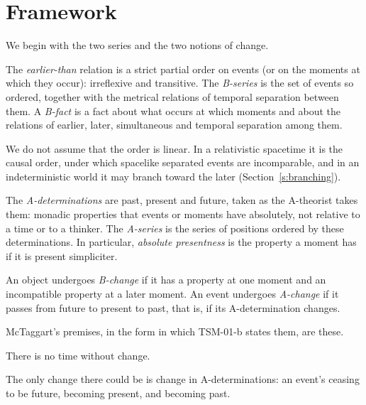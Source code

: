 \documentclass{situationist-preprint}
\begin{document}
\section{Framework}\label{s:framework}

We begin with the two series and the two notions of change.

\begin{definition}[B-series]\label{d:bseries}
The \emph{earlier-than} relation is a strict partial order on events (or on the moments at which they occur): irreflexive and transitive. The \emph{B-series} is the set of events so ordered, together with the metrical relations of temporal separation between them. A \emph{B-fact} is a fact about what occurs at which moments and about the relations of earlier, later, simultaneous and temporal separation among them.
\end{definition}

We do not assume that the order is linear. In a relativistic spacetime it is the causal order, under which spacelike separated events are incomparable, and in an indeterministic world it may branch toward the later (Section~\ref{s:branching}).

\begin{definition}[A-determinations]\label{d:adet}
The \emph{A-determinations} are past, present and future, taken as the A-theorist takes them: monadic properties that events or moments have absolutely, not relative to a time or to a thinker. The \emph{A-series} is the series of positions ordered by these determinations. In particular, \emph{absolute presentness} is the property a moment has if it is present simpliciter.
\end{definition}

\begin{definition}\label{d:change}
An object undergoes \emph{B-change} if it has a property at one moment and an incompatible property at a later moment. An event undergoes \emph{A-change} if it passes from future to present to past, that is, if its A-determination changes.
\end{definition}

McTaggart's premises, in the form in which TSM-01-b states them, are these.

\begin{assumption}\label{a:m1}
There is no time without change.
\end{assumption}

\begin{assumption}\label{a:m2}
The only change there could be is change in A-determinations: an event's ceasing to be future, becoming present, and becoming past.
\end{assumption}
\end{document}
